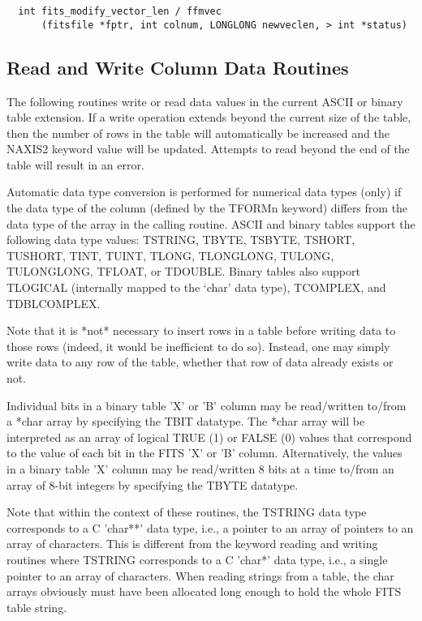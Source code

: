 \documentclass[11pt]{book}
\begin{document}
\begin{verbatim}
  int fits_modify_vector_len / ffmvec
      (fitsfile *fptr, int colnum, LONGLONG newveclen, > int *status)
\end{verbatim}

\subsection{Read and Write Column Data Routines}

The following routines write or read data values in the current ASCII
or binary table extension.  If a write operation extends beyond the
current size of the table, then the number of rows in the table will
automatically be increased and the NAXIS2 keyword value will be
updated.  Attempts to read beyond the end of the table will result in
an error.

Automatic data type conversion is performed for numerical data types
(only) if the data type of the column (defined by the TFORMn keyword)
differs from the data type of the array in the calling routine.  ASCII and binary
tables support the following data type values:  TSTRING, TBYTE, TSBYTE, TSHORT,
TUSHORT, TINT, TUINT, TLONG, TLONGLONG, TULONG, TULONGLONG, TFLOAT, or TDOUBLE.
Binary tables also support TLOGICAL (internally mapped to the `char'
data type), TCOMPLEX, and TDBLCOMPLEX.

Note that it is *not* necessary to insert rows in a table before
writing data to those rows (indeed, it would be inefficient to do so).
Instead, one may simply write data to any row of the table, whether that
row of data already exists or not.

Individual bits in a binary table 'X' or 'B' column may be read/written
to/from a *char array by specifying the TBIT datatype.  The *char
array will be interpreted as an array of logical TRUE (1) or FALSE (0)
values that correspond to the value of each bit in the FITS 'X' or 'B' column.
Alternatively, the values in a binary table 'X' column may be read/written
8 bits at a time to/from an array of 8-bit integers by specifying the
TBYTE datatype.

Note that within the context of these routines, the TSTRING data type
corresponds to a C 'char**' data type, i.e., a pointer to an array of
pointers to an array of characters.  This is different from the keyword
reading and writing routines where TSTRING corresponds to a C 'char*'
data type, i.e., a single pointer to an array of characters.  When
reading strings from a table, the char arrays obviously must have been
allocated long enough to hold the whole FITS table string.
\end{document}
